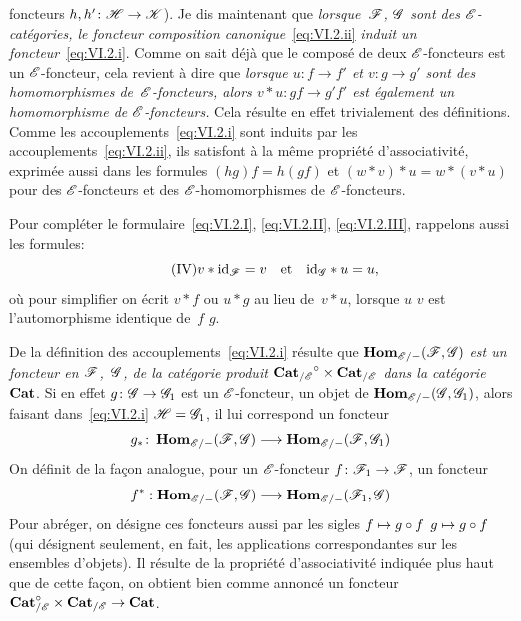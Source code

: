 foncteurs $h,h'\colon \cal{H}\to\cal{K}$). Je dis maintenant que
\emph{lorsque~$\cal{F}$, $\cal{G}$ sont des $\cal{E}$-catégories,
le foncteur composition canonique}~\eqref{eq:VI.2.ii} \emph{induit un
foncteur}~\eqref{eq:VI.2.i}. Comme on sait d\'ej\`a que le
compos\'e de deux $\cal{E}$-foncteurs est un $\cal{E}$-foncteur,
cela revient \`a dire que \emph{lorsque $u\colon f\to f'$ et
$v\colon g\to g'$ sont des homomorphismes de~$\cal{E}$-foncteurs,
alors $v*u\colon gf\to g'f'$ est également un homomorphisme de
$\cal{E}$-foncteurs.} Cela r\'esulte en effet trivialement des
d\'efinitions. Comme les accouplements~\eqref{eq:VI.2.i} sont
induits par les accouplements~\eqref{eq:VI.2.ii}, ils satisfont \`a
la m\^eme propri\'et\'e d'associativit\'e, exprim\'ee aussi
dans les formules $(hg)f=h(gf)$ et $(w*v)*u=w*(v*u)$ pour des
$\cal{E}$-foncteurs et des $\cal{E}$-homomorphismes de
$\cal{E}$-foncteurs.

Pour compl\'eter le formulaire~\eqref{eq:VI.2.I},
\eqref{eq:VI.2.II}, \eqref{eq:VI.2.III}, rappelons aussi les formules:
\begin{equation*}
\label{eq:VI.2.IV}
\tag{IV} {v*\id_{\cal{F}}=v\quad\text{et}\quad\id_{\cal{G}}*u=u}\quoi,
\end{equation*}
o\`u
pour simplifier on \'ecrit $v*f$ ou $u*g$ au lieu de~$v*u$, lorsque
$u$ \resp $v$ est l'automorphisme identique de~$f$ \resp $g$.

De la d\'efinition des accouplements~\eqref{eq:VI.2.i} r\'esulte
que $\SheafHom_{\cal{E}/-}(\cal{F},\cal{G})$ \emph{est un foncteur en
$\cal{F}$,~$\cal{G}$,
de la catégorie produit
${\Cat_{/\cal{E}}}^\circ\times\Cat_{/\cal{E}}$ dans la
catégorie~$\mathbf{Cat}$}. Si en effet $g\colon \cal{G}\to\cal{G}_1$ est
un $\cal{E}$-foncteur, \ie un objet de
$\SheafHom_{\cal{E}/-}(\cal{G},\cal{G}_1)$, alors faisant
dans~\eqref{eq:VI.2.i} $\cal{H}=\cal{G}_1$, il lui correspond un
foncteur
$$
g_*\colon\SheafHom_{\cal{E}/-}(\cal{F},\cal{G})\to
\SheafHom_{\cal{E}/-}(\cal{F},\cal{G}_1)
$$
On d\'efinit de la fa\c con analogue, pour un $\cal{E}$-foncteur
$f\colon \cal{F}_1\to \cal{F}$, un foncteur
$$
f^*:\SheafHom_{\cal{E}/-}(\cal{F},\cal{G})\to
\SheafHom_{\cal{E}/-}(\cal{F}_1,\cal{G})
$$
Pour abr\'eger, on d\'esigne ces foncteurs aussi par les sigles
$f\mto g\circ f$ \resp $g\mto g\circ f$ (qui d\'esignent
seulement, en fait, les applications correspondantes sur les ensembles
d'objets). Il r\'esulte de la propri\'et\'e d'associativit\'e
indiqu\'ee plus haut que de cette fa\c con, on obtient bien comme
annonc\'e un foncteur
$\Cat_{/\cal{E}}^\circ\times\Cat_{/\cal{E}}\to\Cat$.

